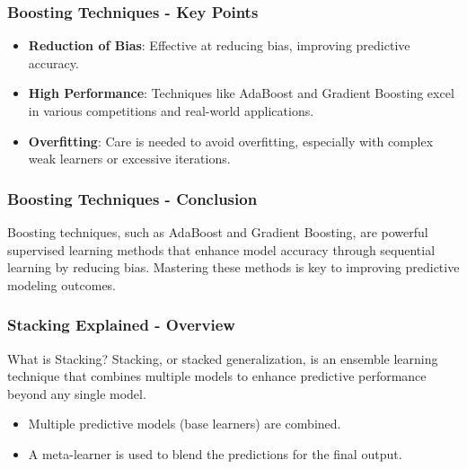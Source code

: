 \documentclass[aspectratio=169]{beamer}
\begin{document}
\begin{frame}[fragile]
  \frametitle{Boosting Techniques - Key Points}
  \begin{itemize}
    \item \textbf{Reduction of Bias}: Effective at reducing bias, improving predictive accuracy.
    \item \textbf{High Performance}: Techniques like AdaBoost and Gradient Boosting excel in various competitions and real-world applications.
    \item \textbf{Overfitting}: Care is needed to avoid overfitting, especially with complex weak learners or excessive iterations.
  \end{itemize}
\end{frame}

\begin{frame}[fragile]
  \frametitle{Boosting Techniques - Conclusion}
  Boosting techniques, such as AdaBoost and Gradient Boosting, are powerful supervised learning methods that enhance model accuracy through sequential learning by reducing bias. Mastering these methods is key to improving predictive modeling outcomes.
\end{frame}

\begin{frame}[fragile]
    \frametitle{Stacking Explained - Overview}
    \begin{block}{What is Stacking?}
        Stacking, or stacked generalization, is an ensemble learning technique that combines multiple models to enhance predictive performance beyond any single model. 
    \end{block}
    \begin{itemize}
        \item Multiple predictive models (base learners) are combined.
        \item A meta-learner is used to blend the predictions for the final output.
    \end{itemize}
\end{frame}
\end{document}
